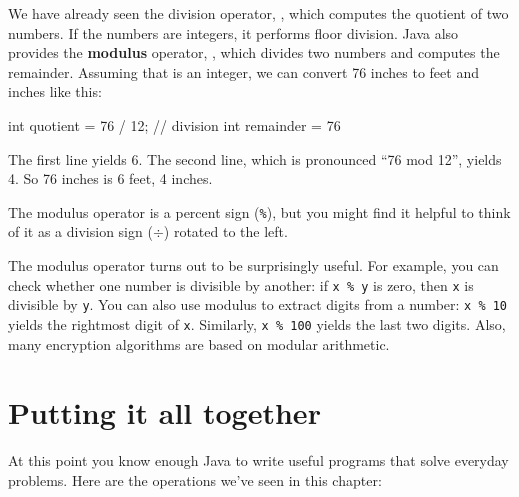 
We have already seen the division operator, \java{/}, which computes
the quotient of two numbers.  If the numbers are integers, it performs
floor division.
Java also provides the {\bf modulus} operator, \java{\%}, which
divides two numbers and computes the remainder.  Assuming that
 is an integer, we can convert 76 inches to feet and inches like this:

\begin{code}
    int quotient = 76 / 12;   // division
    int remainder = 76 %
\end{code}

The first line yields 6.
The second line, which is pronounced ``76 mod 12'', yields 4.
So 76 inches is 6 feet, 4 inches.

The modulus operator is a percent sign ({\tt \%}), but you might find it helpful to think of it as a division sign ($\div$) rotated to the left.


The modulus operator turns out to be surprisingly useful.  For
example, you can check whether one number is divisible by another: if
{\tt x \% y} is zero, then {\tt x} is divisible by {\tt y}.  You can
also use modulus to extract digits from a number: {\tt x \% 10} yields
the rightmost digit of {\tt x}.  Similarly, {\tt x \% 100} yields the
last two digits.  Also, many encryption algorithms are based on
modular arithmetic.


\section{Putting it all together}

At this point you know enough Java to write useful programs that solve everyday problems.
Here are the operations we've seen in this chapter:

